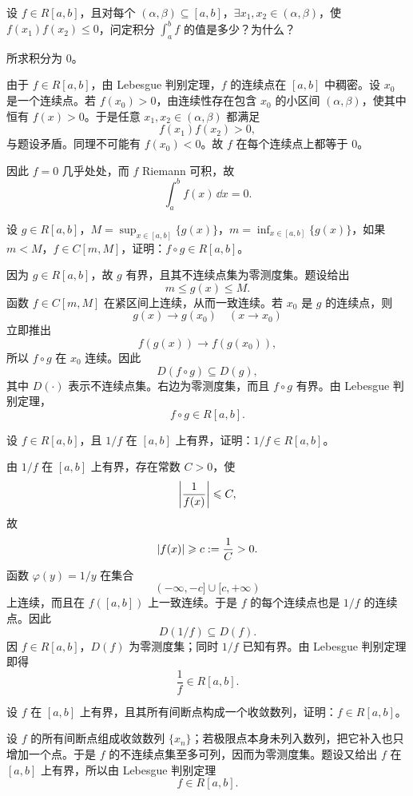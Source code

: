\begin{xexercise}[5]
设 $f\in R[a,b]$，且对每个 $(\alpha,\beta)\subseteq[a,b]$，$\exists x_1,x_2\in(\alpha,\beta)$，使 $f(x_1)f(x_2)\leqslant0$，问定积分 $\int_a^b f$ 的值是多少？为什么？
\end{xexercise}
\begin{xsolution}
所求积分为 $0$。

由于 $f\in R[a,b]$，由 Lebesgue 判别定理，$f$ 的连续点在 $[a,b]$ 中稠密。设 $x_0$ 是一个连续点。若 $f(x_0)>0$，由连续性存在包含 $x_0$ 的小区间 $(\alpha,\beta)$，使其中恒有 $f(x)>0$。于是任意 $x_1,x_2\in(\alpha,\beta)$ 都满足
\[
  f(x_1)f(x_2)>0,
\]
与题设矛盾。同理不可能有 $f(x_0)<0$。故 $f$ 在每个连续点上都等于 $0$。

因此 $f=0$ 几乎处处，而 $f$ Riemann 可积，故
\[
  \boxed{\int_a^b f(x)\,\dd x=0}.
\]
\end{xsolution}


\begin{xexercise}[6]
设 $g\in R[a,b]$，$M=\sup_{x\in[a,b]}\{g(x)\}$，$m=\inf_{x\in[a,b]}\{g(x)\}$，如果 $m<M$，$f\in C[m,M]$，证明：$f\circ g\in R[a,b]$。
\end{xexercise}
\begin{xsolution}
因为 $g\in R[a,b]$，故 $g$ 有界，且其不连续点集为零测度集。题设给出
\[
  m\leqslant g(x)\leqslant M.
\]
函数 $f\in C[m,M]$ 在紧区间上连续，从而一致连续。若 $x_0$ 是 $g$ 的连续点，则
\[
  g(x)\to g(x_0)\quad(x\to x_0)
\]
立即推出
\[
  f(g(x))\to f(g(x_0)),
\]
所以 $f\circ g$ 在 $x_0$ 连续。因此
\[
  D(f\circ g)\subseteq D(g),
\]
其中 $D(\cdot)$ 表示不连续点集。右边为零测度集，而且 $f\circ g$ 有界。由 Lebesgue 判别定理，
\[
  f\circ g\in R[a,b].
\]
\end{xsolution}


\begin{xexercise}[7]
设 $f\in R[a,b]$，且 $1/f$ 在 $[a,b]$ 上有界，证明：$1/f\in R[a,b]$。
\end{xexercise}
\begin{xsolution}
由 $1/f$ 在 $[a,b]$ 上有界，存在常数 $C>0$，使
\[
  \abs*{\frac1{f(x)}}\leqslant C,
\]
故
\[
  \abs{f(x)}\geqslant c:=\frac1C>0.
\]
函数 $\varphi(y)=1/y$ 在集合
\[
  (-\infty,-c]\cup[c,+\infty)
\]
上连续，而且在 $f([a,b])$ 上一致连续。于是 $f$ 的每个连续点也是 $1/f$ 的连续点。因此
\[
  D(1/f)\subseteq D(f).
\]
因 $f\in R[a,b]$，$D(f)$ 为零测度集；同时 $1/f$ 已知有界。由 Lebesgue 判别定理即得
\[
  \frac1f\in R[a,b].
\]
\end{xsolution}


\begin{xexercise}[8]
设 $f$ 在 $[a,b]$ 上有界，且其所有间断点构成一个收敛数列，证明：$f\in R[a,b]$。
\end{xexercise}
\begin{xsolution}
设 $f$ 的所有间断点组成收敛数列 $\{x_n\}$；若极限点本身未列入数列，把它补入也只增加一个点。于是 $f$ 的不连续点集至多可列，因而为零测度集。题设又给出 $f$ 在 $[a,b]$ 上有界，所以由 Lebesgue 判别定理
\[
  f\in R[a,b].
\]
\end{xsolution}


